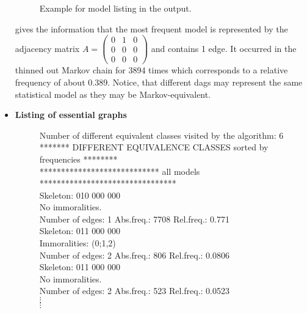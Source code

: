 \begin{itemize}
\begin{figure}
\begin{center}
\end{center}
{\em\caption{\label{output} Example for model listing in the
output.}}
\end{figure}
%
gives the information that the most frequent model is represented
by the adjacency matrix $ A = \left( \begin{array} {cccc}
0&1&0   \\
0&0&0   \\
0&0&0
\end{array}
\right )$ and contains 1 edge. It occurred in the thinned out
Markov chain for 3894 times which corresponds to a relative
frequency of about 0.389. Notice, that different dags may
represent the same statistical model as they may be
Markov-equivalent.
%
%
\item {\bf Listing of essential graphs}\\
\begin{figure}
{\it

Number of different equivalent classes visited by the algorithm: 6 \\[0.5cm]
******* DIFFERENT EQUIVALENCE CLASSES sorted by frequencies  ********\\
**************************** all models ******************************** \\[0.5cm]

Skeleton: 010 000 000\\
No immoralities.\\
Number of edges: 1 \hspace{0.3cm} Abs.freq.: 7708 \hspace{0.3cm} Rel.freq.: 0.771 \\[0.3cm]

Skeleton: 011 000 000 \\
Immoralities: (0;1,2) \\
Number of edges: 2 \hspace{0.3cm} Abs.freq.: 806 \hspace{0.3cm} Rel.freq.: 0.0806 \\[0.3cm]

Skeleton: 011 000 000 \\
No immoralities. \\
Number of edges: 2 \hspace{0.3cm} Abs.freq.: 523 \hspace{0.3cm} Rel.freq.: 0.0523\\

$\vdots$ \\[-0.15cm]
$\vdots$

}
\end{figure}
\end{itemize}
